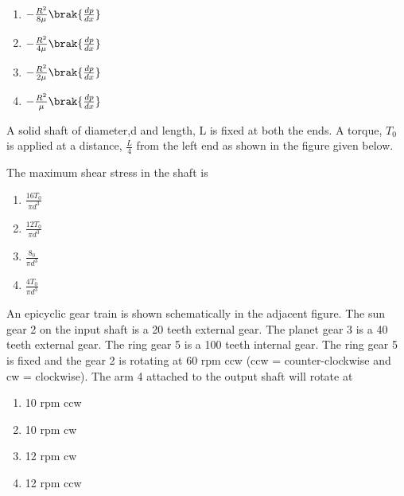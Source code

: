 \begin{figure}[!ht]
    \centering
    \label{fig:velocity profile}
    \end{figure}
\begin{enumerate}
    \item  $-\frac{R^2}{8 \mu} \brak{\frac{dp}{dx}}$
    \item  $-\frac{R^2}{4 \mu} \brak{\frac{dp}{dx}}$
    \item  $-\frac{R^2}{2 \mu} \brak{\frac{dp}{dx}}$
    \item  $-\frac{R^2}{ \mu} \brak{\frac{dp}{dx}}$
  \end{enumerate}
\item A solid shaft of diameter,d and length, L is fixed at both the ends. A torque, $T_0$ is applied at a distance, $\frac{L}{4}$ from the left end as shown in the figure given below.
\begin{figure}[!ht]
    \centering
    \label{fig:shaft}
    \end{figure}
The maximum shear stress in the shaft is 
\begin{enumerate}
    \item  $\frac{16T_0}{\pi d^3}$
    \item  $\frac{12T_0}{\pi d^3}$
    \item  $\frac{8_0}{\pi d^3}$
    \item  $\frac{4T_0}{\pi d^3}$
  \end{enumerate}
\item An epicyclic gear train is shown schematically in the adjacent figure. The sun gear 2 on the input shaft is a 20 teeth external gear. The planet gear 3 is a 40 teeth external gear. The ring gear 5 is a 100 teeth internal gear. The ring gear 5 is fixed and the gear 2 is rotating at 60 rpm ccw (ccw = counter-clockwise and cw = clockwise). The arm 4 attached to the output shaft will rotate at 
\begin{figure}[!ht]
    \centering
    \label{fig:shaft}
    \end{figure}
\begin{enumerate}
    \item  10 rpm ccw
    \item  10 rpm cw
    \item  12 rpm cw
    \item  12 rpm ccw
  \end{enumerate}

